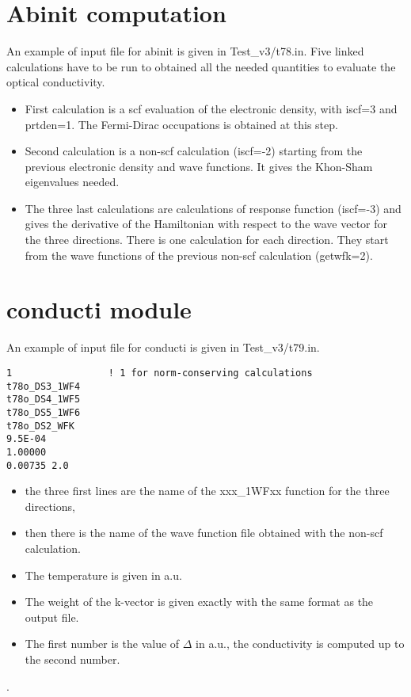 \documentclass[a4,12pts]{article}
\begin{document}
\section{Abinit computation}
An example of input file for abinit is given in Test\_v3/t78.in. Five linked
calculations have to be run to obtained all the needed quantities to evaluate
the optical conductivity.
\begin{itemize}
\item First calculation is a scf evaluation of the electronic density, with iscf=3 and
prtden=1. The Fermi-Dirac occupations is obtained at this step.
\item Second calculation is a non-scf calculation (iscf=-2) starting from the previous electronic density
and wave functions. It gives the Khon-Sham eigenvalues needed.
\item The three last calculations are calculations of response function (iscf=-3) and
gives the derivative of the Hamiltonian with respect to the wave vector
for the three directions. There is one calculation for each direction.
They start from the wave functions of the previous non-scf calculation (getwfk=2).

\end{itemize}


\section{conducti module}
An example of input file for conducti is given in Test\_v3/t79.in.
\begin{verbatim}
1                 ! 1 for norm-conserving calculations
t78o_DS3_1WF4
t78o_DS4_1WF5
t78o_DS5_1WF6
t78o_DS2_WFK
9.5E-04
1.00000
0.00735 2.0
\end{verbatim}

\begin {itemize}
\item the three first lines are the name of the xxx\_1WFxx function for the three directions,
\item  then there is the
name of the wave function file obtained with the non-scf calculation.
\item The temperature is given in a.u.
\item The weight of the k-vector is given exactly with the same format as the output file.
\item The first number is the value of $\Delta$ in a.u., the conductivity is computed up to the second number.
\end{itemize}.
\end{document}
